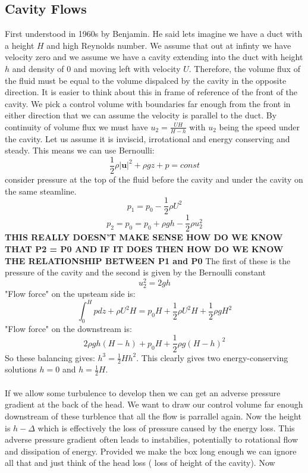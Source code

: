 \documentclass{article}
\begin{document}
           \subsection{Cavity Flows}
           First understood in 1960s by Benjamin. He said lets imagine we have a duct with a height $H$ and high Reynolds number. We assume that out at infinty we have velocity zero and we assume we have a cavity extending into the duct with height $h$ and density of 0 and moving left with velocity $U$. Therefore, the volume flux of the fluid must be equal to the volume dispalced by the cavity in the opposite direction. It is easier to think about this in frame of reference of the front of the cavity. We pick a control volume with boundaries far enough from the front in either direction that we can assume the velocity is parallel to the duct. By continuity of volume flux we must have $u_2 = \frac{UH}{H-h}$ with $u_2$ being the speed under the cavity. Let us assume it is inviscid, irrotational and energy conserving and steady. This means we can use Bernoulli:
           $$
            \frac{1}{2} \rho|\bm u|^2 + \rho g z + p = const
           $$
           consider pressure at the top of the fluid before the cavity and under the cavity on the same steamline.           $$
            p_1 = p_0 - \frac{1}{2} \rho U^2
           $$
           $$
           p_2 = p_0  = p_0 + \rho g h - \frac{1}{2} \rho u_2^2
           $$
           \textbf{THIS REALLY DOESN'T MAKE SENSE HOW DO WE KNOW THAT P2 = P0 AND IF IT DOES THEN HOW DO WE KNOW THE RELATIONSHIP BETWEEN P1 and P0}
           The first of these is the pressure of the cavity and the second is given by the Bernoulli constant \\
           $$
            u_2^2 = 2 gh
           $$
           "Flow force" on the upsteam side is:
           $$
           \int_0^H p dz + \rho U^2 H = p_0 H + \frac{1}{2} \rho U^2 H + \frac{1}{2} \rho g H^2
           $$
           "Flow force" on the downstream is:
           $$
            2\rho g h( H-h) + p_0 H + \frac{1}{2} \rho g( H-h)^2
           $$
           So these balancing gives: $h^3 = \frac{1}{2} Hh^2$. This clearly gives two energy-conserving solutions $h=0$ and $h = \frac{1}{2} H$.\\\\
        If we allow some turbulence to develop then we can get an adverse pressure gradient at the back of the head. We want to draw our control volume far enough downstream of these turblence that all the flow is parrallel again. Now the height is $h - \Delta$ which is effectively the loss of pressure caused by the energy loss. This adverse pressure gradient often leads to instabilies, potentially to rotational flow and dissipation of energy. Provided we make the box long enough we can ignore all that and just think of the head loss ( loss of height of the cavity). Now
\end{document}

